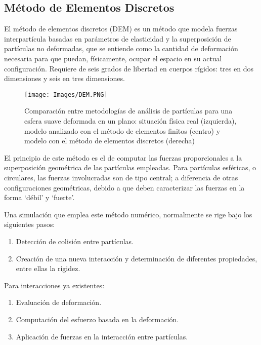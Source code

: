 \subsection{M\'etodo de Elementos Discretos}


\noindent
\justify

El m\'etodo de elementos discretos (DEM) es un m\'etodo que modela fuerzas interpart\'icula basadas en par\'ametros de elasticidad y la superposici\'on de part\'iculas no deformadas, que se entiende como la cantidad de deformaci\'on necesaria para que puedan, f\'isicamente, ocupar el espacio en su actual configuraci\'on. Requiere de seis grados de libertad en cuerpos r\'igidos: tres en dos dimensiones y seis en tres dimensiones.

\begin{figure}[h!]
	\centering
	\texttt{[image: Images/DEM.PNG]}
	\label{dem}
	\caption{Comparaci\'on entre metodolog\'ias de an\'alisis de part\'iculas para una esfera suave deformada en un plano: situaci\'on f\'isica real (izquierda), modelo analizado con el m\'etodo de elementos finitos (centro) y modelo con el m\'etodo de elementos discretos (derecha)}
\end{figure}

\noindent
\justify

El principio de este m\'etodo es el de computar las fuerzas proporcionales a la superposici\'on geom\'etrica de las part\'iculas empleadas. Para part\'iculas esf\'ericas, o circulares, las fuerzas involucradas son de tipo central; a diferencia de otras configuraciones geom\'etricas, debido a que deben caracterizar las fuerzas en la forma `d\'ebil' y `fuerte'. 

\noindent
\justify

Una simulaci\'on que emplea este m\'etodo num\'erico, normalmente se rige bajo los siguientes pasos:

\begin{enumerate}
	\item Detecci\'on de colisi\'on entre part\'iculas.
	\item Creaci\'on de una nueva interacci\'on y determinaci\'on de diferentes propiedades, entre ellas la rigidez.
\end{enumerate}

\noindent
\justify

Para interacciones ya existentes:

\begin{enumerate}
	\item Evaluaci\'on de deformaci\'on.
	\item Computaci\'on del esfuerzo basada en la deformaci\'on.
	\item Aplicaci\'on de fuerzas en la interacci\'on entre part\'iculas.
\end{enumerate}

